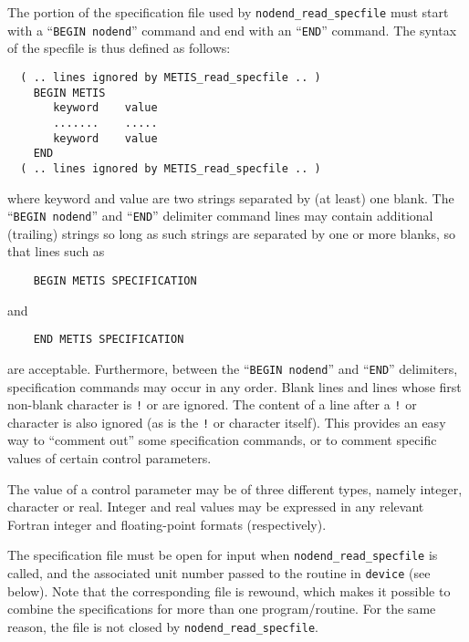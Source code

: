 \documentclass{galahad}
\newcommand{\packagename}{nodend}
\begin{document}
The portion of the specification file used by
{\tt \packagename\_read\_specfile}
must start
with a ``{\tt BEGIN \packagename}'' command and end with an
``{\tt END}'' command.  The syntax of the specfile is thus defined as follows:
\begin{verbatim}
  ( .. lines ignored by METIS_read_specfile .. )
    BEGIN METIS
       keyword    value
       .......    .....
       keyword    value
    END
  ( .. lines ignored by METIS_read_specfile .. )
\end{verbatim}
where keyword and value are two strings separated by (at least) one blank.
The ``{\tt BEGIN \packagename}'' and ``{\tt END}'' delimiter command lines
may contain additional (trailing) strings so long as such strings are
separated by one or more blanks, so that lines such as
\begin{verbatim}
    BEGIN METIS SPECIFICATION
\end{verbatim}
and
\begin{verbatim}
    END METIS SPECIFICATION
\end{verbatim}
are acceptable. Furthermore,
between the
``{\tt BEGIN \packagename}'' and ``{\tt END}'' delimiters,
specification commands may occur in any order.  Blank lines and
lines whose first non-blank character is {\tt !} or {\tt *} are ignored.
The content
of a line after a {\tt !} or {\tt *} character is also
ignored (as is the {\tt !} or {\tt *}
character itself). This provides an easy way to ``comment out'' some
specification commands, or to comment specific values
of certain control parameters.

The value of a control parameter may be of three different types, namely
integer, character or real.
Integer and real values may be expressed in any relevant Fortran integer and
floating-point formats (respectively).

The specification file must be open for
input when {\tt \packagename\_read\_specfile}
is called, and the associated unit number
passed to the routine in {\tt device} (see below).
Note that the corresponding
file is rewound, which makes it possible to combine the specifications
for more than one program/routine.  For the same reason, the file is not
closed by {\tt \packagename\_read\_specfile}.
\end{document}
